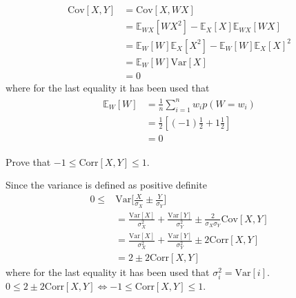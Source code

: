 \begin{example}
\begin{enumerate}
		\begin{equation}
			\begin{split}
				\text{Cov}[X,Y] &= \text{Cov}[X,WX] \\
				&= \mathbb{E}_{WX}[WX^2]-\mathbb{E}_X[X]\mathbb{E}_{WX}[WX]\\
				&= \mathbb{E}_W[W]\mathbb{E}_X[X^2]-\mathbb{E}_W[W]\mathbb{E}_X[X]^2\\
				&= \mathbb{E}_W[W]\text{Var}[X]\\
				& = 0
			\end{split}
		\end{equation}
		where for the last equality it has been used that
		\begin{equation}
			\begin{split}
				\begin{split}
					\mathbb{E}_W[W]&= \frac{1}{n}\sum_{i=1}^nw_ip(W = w_i)\\
					&= \frac{1}{2}[(-1)\frac{1}{2}+1\frac{1}{2}]\\
					&= 0
				\end{split}
			\end{split}
		\end{equation}
		
	\end{enumerate}
	
\end{example}

\begin{example}
	Prove that $-1\leq \text{Corr}[X,Y]\leq 1$.\newline
	
	Since the variance is defined as positive definite
	\begin{equation}
		\begin{split}
			0\leq& \text{Var}\bigg[\frac{X}{\sigma_X}\pm\frac{Y}{\sigma_Y}\bigg]\\
			& = \frac{\text{Var}[X]}{\sigma_X^2}+\frac{\text{Var}[Y]}{\sigma_Y^2}\pm \frac{2}{\sigma_X\sigma_Y}\text{Cov}[X,Y]\\
			& = \frac{\text{Var}[X]}{\sigma_X^2}+\frac{\text{Var}[Y]}{\sigma_Y^2}\pm 2\text{Corr}[X,Y]\\
			& = 2\pm 2\text{Corr}[X,Y]
		\end{split}
	\end{equation}
	where for the last equality it has been used that $\sigma_i^2=\text{Var}[i]$. $0\leq 2\pm 2\text{Corr}[X,Y]\Leftrightarrow -1\leq \text{Corr}[X,Y]\leq 1$.		
\end{example}

